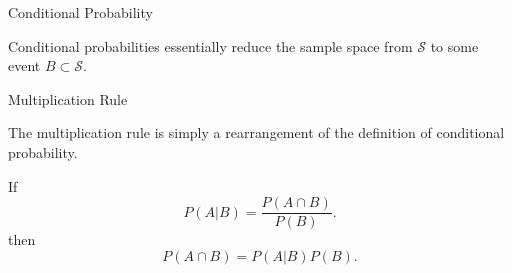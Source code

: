 \documentclass[aspectratio=169,xcolor=pdftex,dvipsnames,table]{beamer}\usepackage[]{graphicx}\usepackage[]{xcolor}
\begin{document}
\begin{frame}{Conditional Probability}

Conditional probabilities essentially reduce the sample space from $\mathcal S$ to some event $B \subset \mathcal S$.

\begin{center}
\end{center}
\end{frame}

\begin{frame}{Multiplication Rule}

The multiplication rule is simply a rearrangement of the definition of conditional probability. 

If
  \[
    P(A|B)=\frac{P(A \cap B)}{P(B)}.
  \]
then
  \[
    P(A \cap B)=P(A|B){P(B)}.
  \]

\end{frame}
\end{document}
